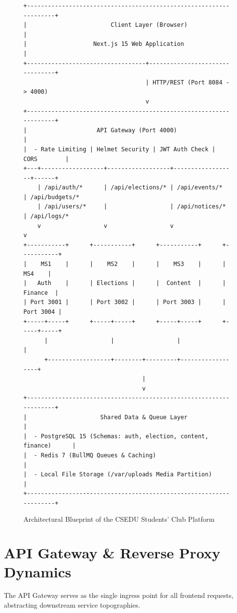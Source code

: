 \documentclass[12pt, a4paper]{report}
\begin{document}
\begin{figure}[h!]
\centering
\begin{tcolorbox}[colback=codebg,colframe=primaryblue,title=\textbf{System Topography \& Network Topology}]
\begin{verbatim}
+-------------------------------------------------------------------+
|                        Client Layer (Browser)                     |
|                   Next.js 15 Web Application                      |
+----------------------------------+--------------------------------+
                                   | HTTP/REST (Port 8084 -> 4000)
                                   v
+-------------------------------------------------------------------+
|                    API Gateway (Port 4000)                        |
|  - Rate Limiting | Helmet Security | JWT Auth Check | CORS        |
+---+------------------+------------------+------------------+------+
    | /api/auth/*      | /api/elections/* | /api/events/*    | /api/budgets/*
    | /api/users/*     |                  | /api/notices/*   | /api/logs/*
    v                  v                  v                  v
+-----------+      +-----------+      +-----------+      +-----------+
|    MS1    |      |    MS2    |      |    MS3    |      |    MS4    |
|   Auth    |      | Elections |      |  Content  |      |  Finance  |
| Port 3001 |      | Port 3002 |      | Port 3003 |      | Port 3004 |
+-----+-----+      +-----+-----+      +-----+-----+      +-----+-----+
      |                  |                  |                  |
      +------------------+--------+---------+------------------+
                                  |
                                  v
+-------------------------------------------------------------------+
|                     Shared Data & Queue Layer                     |
|  - PostgreSQL 15 (Schemas: auth, election, content, finance)      |
|  - Redis 7 (BullMQ Queues & Caching)                             |
|  - Local File Storage (/var/uploads Media Partition)              |
+-------------------------------------------------------------------+
\end{verbatim}
\end{tcolorbox}
\caption{Architectural Blueprint of the CSEDU Students' Club Platform}
\label{fig:arch_diagram}
\end{figure}

\section{API Gateway \& Reverse Proxy Dynamics}
The API Gateway serves as the single ingress point for all frontend requests, abstracting downstream service topographies.
\end{document}
